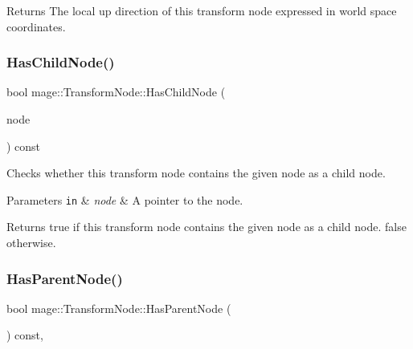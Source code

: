 \begin{DoxyReturn}{Returns}
The local up direction of this transform node expressed in world space coordinates. 
\end{DoxyReturn}
\hypertarget{structmage_1_1_transform_node_ac83d9d2013494588fb45a469057b18f6}{}\label{structmage_1_1_transform_node_ac83d9d2013494588fb45a469057b18f6} 
\subsubsection{\texorpdfstring{Has\+Child\+Node()}{HasChildNode()}}
{\footnotesize\ttfamily bool mage\+::\+Transform\+Node\+::\+Has\+Child\+Node (\begin{DoxyParamCaption}\item[{\hyperlink{namespacemage_a1e01ae66713838a7a67d30e44c67703e}{Shared\+Ptr}$<$ const \hyperlink{classmage_1_1_node}{Node} $>$}]{node }\end{DoxyParamCaption}) const\hspace{0.3cm}{\ttfamily [private]}}

Checks whether this transform node contains the given node as a child node.


\begin{DoxyParams}[1]{Parameters}
\mbox{\tt in}  & {\em node} & A pointer to the node. \\
\hline
\end{DoxyParams}
\begin{DoxyReturn}{Returns}
{\ttfamily true} if this transform node contains the given node as a child node. {\ttfamily false} otherwise. 
\end{DoxyReturn}
\hypertarget{structmage_1_1_transform_node_ad225b5c9f2236f8c6c91dd7a6a9c4ffd}{}\label{structmage_1_1_transform_node_ad225b5c9f2236f8c6c91dd7a6a9c4ffd} 
\subsubsection{\texorpdfstring{Has\+Parent\+Node()}{HasParentNode()}}
{\footnotesize\ttfamily bool mage\+::\+Transform\+Node\+::\+Has\+Parent\+Node (\begin{DoxyParamCaption}{ }\end{DoxyParamCaption}) const\hspace{0.3cm}{\ttfamily [private]}, {\ttfamily [noexcept]}}

